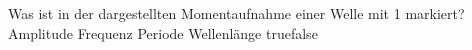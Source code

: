     {Was ist in der dargestellten Momentaufnahme einer Welle mit 1 markiert?}
    {Amplitude}
    {Frequenz}
    {Periode}
    {Wellenlänge}
    {true}{false}